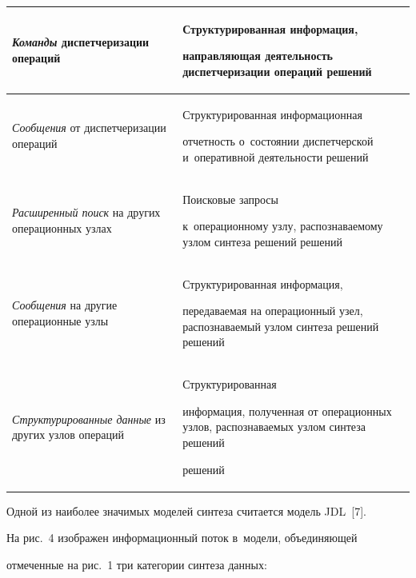 \begin{table}
\begin{center}
\begin{tabular}{|p{41mm}|p{80mm}|}
\textit{Команды} диспетчеризации операций &Структурированная информация, 


на\-прав\-ля\-ющая де\-я\-тель\-ность диспетчеризации операций решений \\


\hline


\textit{Сообщения} от диспетчеризации операций &Структурированная информационная 


отчетность о~со\-сто\-янии диспетчерской и~оперативной де\-я\-тель\-ности решений \\


\hline


\textit{Расширенный поиск} на дру\-гих операционных узлах &Поисковые запросы 


к~операционному узлу, распознаваемому узлом синтеза решений решений \\


\hline


\textit{Сообщения} на другие операционные узлы&Структурированная информация, 


пе\-ре\-да\-ва\-емая на операционный узел, распознаваемый узлом синтеза решений решений \\


\hline


\textit{Структурированные данные} из других узлов операций&Структурированная 


информация, полученная от операционных узлов, распознаваемых узлом синтеза решений 


решений \\


\hline


\end{tabular}


\end{center}


\vspace*{-9pt}


\end{table}


  


  Одной из наиболее значимых моделей синтеза считается модель JDL~[7]. 


На рис.~4 изображен информационный поток в~модели, объединяющей 


отмеченные на рис.~1 три категории синтеза данных:


